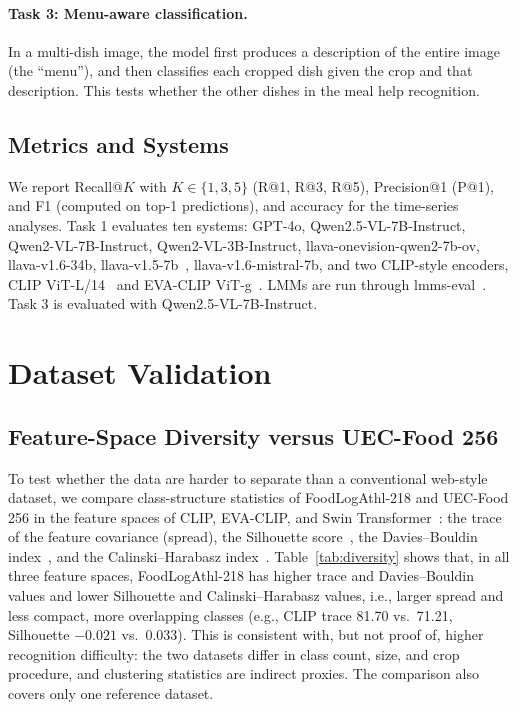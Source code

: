 \documentclass[sigconf, nonacm]{acmart}
\begin{document}
\paragraph{Task 3: Menu-aware classification.} In a multi-dish image, the model first produces a description of the entire image (the ``menu''), and then classifies each cropped dish given the crop and that description. This tests whether the other dishes in the meal help recognition.

\subsection{Metrics and Systems}
We report Recall@$K$ with $K\in\{1,3,5\}$ (R@1, R@3, R@5), Precision@1 (P@1), and F1 (computed on top-1 predictions), and accuracy for the time-series analyses. Task 1 evaluates ten systems: GPT-4o, Qwen2.5-VL-7B-Instruct, Qwen2-VL-7B-Instruct, Qwen2-VL-3B-Instruct, llava-onevision-qwen2-7b-ov, llava-v1.6-34b, llava-v1.5-7b~\cite{liu2024improved}, llava-v1.6-mistral-7b, and two CLIP-style encoders, CLIP ViT-L/14~\cite{CLIP} and EVA-CLIP ViT-g~\cite{sun2023eva}. LMMs are run through lmms-eval~\cite{lmms_eval2024}. Task 3 is evaluated with Qwen2.5-VL-7B-Instruct.

\section{Dataset Validation}
\subsection{Feature-Space Diversity versus UEC-Food 256}
To test whether the data are harder to separate than a conventional web-style dataset, we compare class-structure statistics of FoodLogAthl-218 and UEC-Food 256 in the feature spaces of CLIP, EVA-CLIP, and Swin Transformer~\cite{liu2021swin}: the trace of the feature covariance (spread), the Silhouette score~\cite{rousseeuw1987silhouettes}, the Davies--Bouldin index~\cite{davies1979cluster}, and the Calinski--Harabasz index~\cite{calinski1974dendrite}. Table~\ref{tab:diversity} shows that, in all three feature spaces, FoodLogAthl-218 has higher trace and Davies--Bouldin values and lower Silhouette and Calinski--Harabasz values, i.e., larger spread and less compact, more overlapping classes (e.g., CLIP trace 81.70 vs.\ 71.21, Silhouette $-0.021$ vs.\ 0.033). This is consistent with, but not proof of, higher recognition difficulty: the two datasets differ in class count, size, and crop procedure, and clustering statistics are indirect proxies. The comparison also covers only one reference dataset.
\end{document}
